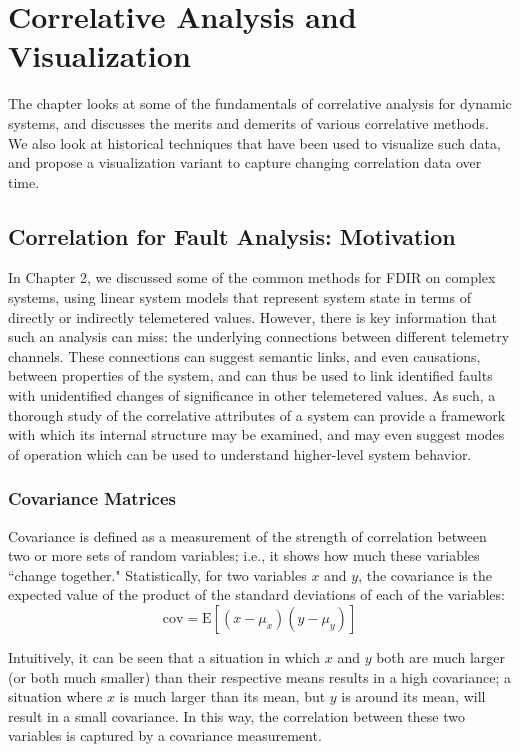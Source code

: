 \chapter{Correlative Analysis and Visualization}

The chapter looks at some of the fundamentals of correlative analysis for dynamic systems, and discusses the merits and demerits of various correlative methods. We also look at historical techniques that have been used to visualize such data, and propose a visualization variant to capture changing correlation data over time.

\section{Correlation for Fault Analysis: Motivation}

In Chapter 2, we discussed some of the common methods for FDIR on complex systems, using linear system models that represent system state in terms of directly or indirectly telemetered values. However, there is key information that such an analysis can miss: the underlying connections between different telemetry channels. These connections can suggest semantic links, and even causations, between properties of the system, and can thus be used to link identified faults with unidentified changes of significance in other telemetered values. As such, a thorough study of the correlative attributes of a system can provide a framework with which its internal structure may be examined, and may even suggest modes of operation which can be used to understand higher-level system behavior.

\subsection{Covariance Matrices}

Covariance is defined as a measurement of the strength of correlation between two or more sets of random variables; i.e., it shows how much these variables ``change together." Statistically, for two variables $x$ and $y$, the covariance is the expected value of the product of the standard deviations of each of the variables:
\begin{equation} \label{eq:cov}
\mathrm{cov} = \text{E}[(x - \mu_{x})(y - \mu_{y})]
\end{equation}

Intuitively, it can be seen that a situation in which $x$ and $y$ both are much larger (or both much smaller) than their respective means results in a high covariance; a situation where $x$ is much larger than its mean, but $y$ is around its mean, will result in a small covariance. In this way, the correlation between these two variables is captured by a covariance measurement.

